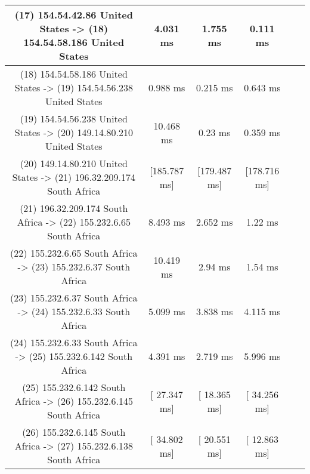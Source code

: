 \begin{table}[]
\begin{tabular}{ | c | c | c | c | c | c | }
(17) 154.54.42.86    United States   -> (18) 154.54.58.186   United States & 	     4.031 ms   	&     1.755 ms   	 &    0.111 ms   \\ \hline
(18) 154.54.58.186   United States   -> (19) 154.54.56.238   United States & 	     0.988 ms   	&     0.215 ms   	 &    0.643 ms   \\ \hline
(19) 154.54.56.238   United States   -> (20) 149.14.80.210   United States & 	    10.468 ms   	&      0.23 ms   	 &    0.359 ms   \\ \hline
(20) 149.14.80.210   United States   -> (21) 196.32.209.174  South Africa  & 	  [185.787 ms]  	&  [179.487 ms]  	 & [178.716 ms]  \\ \hline
(21) 196.32.209.174  South Africa    -> (22) 155.232.6.65    South Africa  & 	     8.493 ms   	&     2.652 ms   	 &     1.22 ms   \\ \hline
(22) 155.232.6.65    South Africa    -> (23) 155.232.6.37    South Africa  & 	    10.419 ms   	&      2.94 ms   	 &     1.54 ms   \\ \hline
(23) 155.232.6.37    South Africa    -> (24) 155.232.6.33    South Africa  & 	     5.099 ms   	&     3.838 ms   	 &    4.115 ms   \\ \hline
(24) 155.232.6.33    South Africa    -> (25) 155.232.6.142   South Africa  & 	     4.391 ms   	&     2.719 ms   	 &    5.996 ms   \\ \hline
(25) 155.232.6.142   South Africa    -> (26) 155.232.6.145   South Africa  & 	  [ 27.347 ms]  	&  [ 18.365 ms]  	 & [ 34.256 ms]  \\ \hline
(26) 155.232.6.145   South Africa    -> (27) 155.232.6.138   South Africa  & 	  [ 34.802 ms]  	&  [ 20.551 ms]  	 & [ 12.863 ms]  \\ \hline
\end{tabular}
\end{table}
